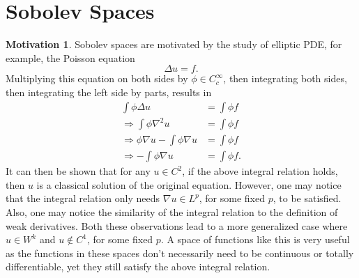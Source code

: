 \documentclass[11pt]{article}
\theoremstyle{definition}
\newtheorem*{motivation}{Motivation}
\begin{document}

\newpage

\section{Sobolev Spaces}
\begin{motivation}
Sobolev spaces are motivated by the study of elliptic PDE, for example, the Poisson equation
\[\Delta{u} = f.\]
Multiplying this equation on both sides by $\phi \in C_{c}^{\infty}$, then integrating both sides, then integrating the left side by parts, results in
\begin{equation*}
	\begin{aligned}
		\int \phi \Delta u &= \int \phi f \\
		\Rightarrow \int \phi \nabla^2 u &= \int \phi f \\
		\Rightarrow \phi \nabla u - \int \phi \nabla u &= \int \phi f \\ 
		\Rightarrow - \int \phi \nabla u &= \int \phi f.
	\end{aligned}
\end{equation*}
It can then be shown that for any $u \in C^2$, if the above integral relation holds, then $u$ is a classical solution of the original equation.
However, one may notice that the integral relation only needs $\nabla u \in L^p$, for some fixed $p$, to be satisfied.
Also, one may notice the similarity of the integral relation to the definition of weak derivatives. Both these observations lead to a more generalized
case where $u \in W^k$ and $u \not\in C^1$, for some fixed $p$.
A space of functions like this is very useful as the functions in these spaces don't necessarily need to be continuous or totally differentiable,
yet they still satisfy the above integral relation. 
\end{motivation}
\end{document}

